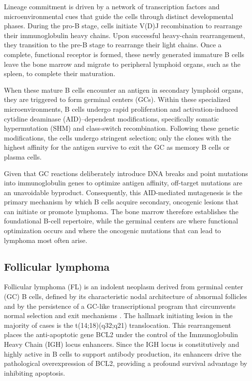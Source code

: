Lineage commitment is driven by a network of transcription factors and microenvironmental cues that guide the cells through distinct developmental phases. During the pro-B stage, cells initiate V(D)J recombination to rearrange their immunoglobulin heavy chains.
Upon successful heavy-chain rearrangement, they transition to the pre-B stage to rearrange their light chains.
Once a complete, functional receptor is formed, these newly generated immature B cells leave the bone marrow and migrate to peripheral lymphoid organs, such as the spleen, to complete their maturation.

When these mature B cells encounter an antigen in secondary lymphoid organs, they are triggered to form germinal centers (GCs).
Within these specialized microenvironments, B cells undergo rapid proliferation and activation-induced cytidine deaminase (AID)–dependent modifications, specifically somatic hypermutation (SHM) and class-switch recombination.
Following these genetic modifications, the cells undergo stringent selection; only the clones with the highest affinity for the antigen survive to exit the GC as memory B cells or plasma cells.

Given that GC reactions deliberately introduce DNA breaks and point mutations into immunoglobulin genes to optimize antigen affinity, off-target mutations are an unavoidable byproduct.
Consequently, this AID-mediated mutagenesis is the primary mechanism by which B cells acquire secondary, oncogenic lesions that can initiate or promote lymphoma.
The bone marrow therefore establishes the foundational B-cell repertoire, while the germinal centers are where functional optimization occurs and where the oncogenic mutations that can lead to lymphoma most often arise. \cite{murphy_janeways_2017}

\subsection{Follicular lymphoma}

Follicular lymphoma (FL) is an indolent neoplasm derived from germinal center (GC) B cells, defined by its characteristic nodal architecture of abnormal follicles and by the persistence of a GC-like transcriptional program that circumvents normal selection and exit mechanisms \cite{krull_follicular_2024}. The hallmark initiating lesion in the majority of cases is the t(14;18)(q32;q21) translocation.
This rearrangement places the anti-apoptotic gene BCL2 under the control of the Immunoglobulin Heavy Chain (IGH) locus enhancers.
Since the IGH locus is constitutively and highly active in B cells to support antibody production, its enhancers drive the pathological overexpression of BCL2, providing a profound survival advantage by inhibiting apoptosis.

